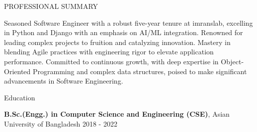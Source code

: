 \documentclass{resume} %
\begin{document}

\begin{rSection}{PROFESSIONAL SUMMARY}

{Seasoned Software Engineer with a robust five-year tenure at imranslab, excelling in Python and Django with an emphasis on AI/ML integration. Renowned for leading complex projects to fruition and catalyzing innovation. Mastery in blending Agile practices with engineering rigor to elevate application performance. Committed to continuous growth, with deep expertise in Object-Oriented Programming and complex data structures, poised to make significant advancements in Software Engineering.}


\end{rSection}

\begin{rSection}{Education}


{\bf B.Sc.(Engg.) in Computer Science and Engineering (CSE)}, Asian University of Bangladesh \hfill {2018 - 2022}


\end{rSection}
\end{document}
